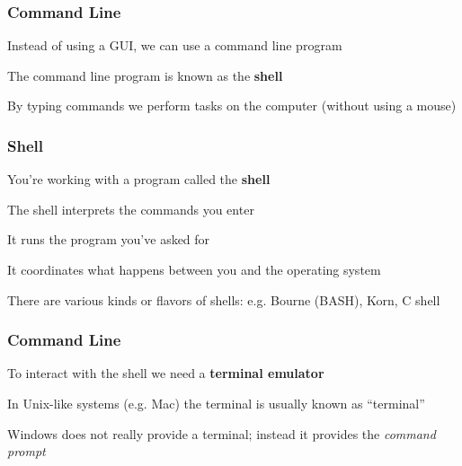 \documentclass[12pt]{beamer}\usepackage[]{graphicx}\usepackage[]{color}
\begin{document}

\begin{frame}
\begin{center}
\Huge{}
\end{center}
\end{frame}


\begin{frame}
\frametitle{Command Line}
\bbi
  \item Instead of using a GUI, we can use a command line program
  \item The command line program is known as the \textbf{shell}
  \item By typing commands we perform tasks on the computer (without using a mouse)
\ei

\end{frame}


\begin{frame}
\frametitle{Shell}

\bi
  \item You're working with a program called the \textbf{shell}
  \item The shell interprets the commands you enter
  \item It runs the program you've asked for
  \item It coordinates what happens between you and the operating system
  \item There are various kinds or flavors of shells: e.g. Bourne (BASH), Korn, C shell
\ei

\end{frame}


\begin{frame}
\frametitle{Command Line}

\bbi
  \item To interact with the shell we need a \textbf{terminal emulator}
  \item In Unix-like systems (e.g. Mac) the terminal is usually known as ``terminal''
  \item Windows does not really provide a terminal; instead it provides the \textit{command prompt}
\ei

\end{frame}
\end{document}

